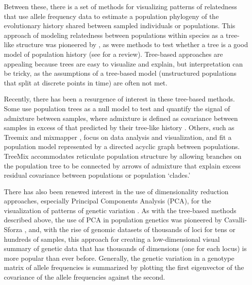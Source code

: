 \documentclass[12pt]{article}
\begin{document}
Between these, there is a set of methods for visualizing patterns of relatedness that use allele frequency data to estimate a population phylogeny of the evolutionary history shared between sampled individuals or populations.  This approach of modeling relatedness between populations within species as a tree-like structure was pioneered by \cite{cavallisforza_edwards1967}, as were methods to test whether a tree is a good model of population history \citep{CavalliSforza1975} (see \citep{Felsenstein1982} for a review).
Tree-based approaches are appealing because trees are easy to visualize and explain,
but interpretation can be tricky,
as the assumptions of a tree-based model
(unstructured populations that split at discrete points in time)
are often not met.
 
Recently, there has been a resurgence of interest in these tree-based methods.  Some use population trees as a null model to test and quantify the signal of admixture between samples, where admixture is defined as covariance between samples in excess of that predicted by their tree-like history \cite{reich_india_2009}.  Others, such as Treemix \citep{Treemix} and mixmapper \citep{lipson_mixmapper_2013}, focus on data analysis and visualization, and fit a population model represented by a directed acyclic graph between populations.  TreeMix accommodates reticulate population structure by allowing branches on the population tree to be connected by arrows of admixture that explain excess residual covariance between populations or population `clades.'

There has also been renewed interest in the use of dimensionality reduction approaches, especially Principal Components Analysis (PCA), for the visualization of patterns of genetic variation \citep{Patterson2006}.  As with the tree-based methods described above, the use of PCA in population genetics was pioneered by Cavalli-Sforza \citep{menozzi1978synthetic}, and, with the rise of genomic datasets of thousands of loci for tens or hundreds of samples, this approach for creating a low-dimensional visual summary of genetic data that has thousands of dimensions (one for each locus) is more popular than ever before.  Generally, the genetic variation in a genotype matrix of allele frequencies is summarized by plotting the first eigenvector of the covariance of the allele frequencies against the second. 
\end{document}
